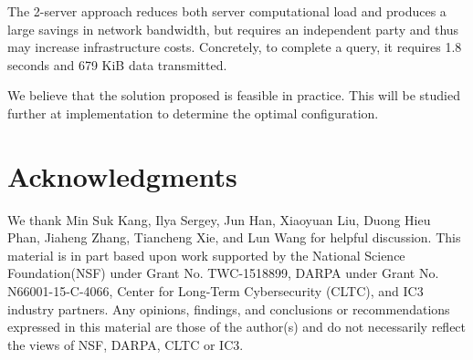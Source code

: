 The 2-server approach reduces both server computational load and produces a large savings in network bandwidth, but requires an independent party and thus may increase infrastructure costs. Concretely, to complete a query, it requires 1.8 seconds and 679 KiB data transmitted.


We believe that the \dect solution proposed is feasible in practice. This will be studied further at implementation to determine the optimal configuration. 




\section*{Acknowledgments}
We thank Min Suk Kang, Ilya Sergey, Jun Han, Xiaoyuan Liu, Duong Hieu Phan, Jiaheng Zhang, Tiancheng Xie, and Lun Wang for helpful discussion.  This material is in part based upon work supported by the National Science Foundation(NSF) under Grant No. TWC-1518899, DARPA under Grant No. N66001-15-C-4066, Center for Long-Term Cybersecurity (CLTC), and IC3 industry partners. Any opinions, findings, and conclusions or recommendations expressed in this material are those of the author(s) and do not necessarily reflect the views of NSF, DARPA, CLTC or IC3.


%	 

